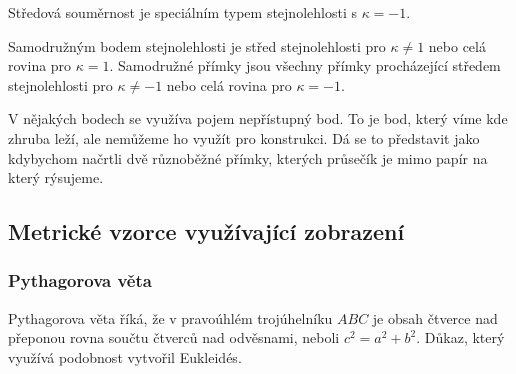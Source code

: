 \documentclass[12pt]{article}
\begin{document}
Středová souměrnost je speciálním typem stejnolehlosti s $\kappa = -1$.

Samodružným bodem stejnolehlosti je střed stejnolehlosti pro $\kappa \ne 1$ nebo celá rovina
pro $\kappa = 1$. Samodružné přímky jsou všechny přímky procházející středem stejnolehlosti pro
$\kappa \ne -1$ nebo celá rovina pro $\kappa = -1$.

V nějakých bodech se využíva pojem nepřístupný bod. To je bod, který víme kde zhruba leží, ale
nemůžeme ho využít pro konstrukci. Dá se to představit jako kdybychom načrtli dvě různoběžné přímky,
kterých průsečík je mimo papír na který rýsujeme.

\subsection*{Metrické vzorce využívající zobrazení}
\subsubsection*{Pythagorova věta}
Pythagorova věta říká, že v pravoúhlém trojúhelníku $ABC$ je obsah čtverce nad přeponou rovna součtu
čtverců nad odvěsnami, neboli $c^2 = a^2 + b^2$. Důkaz, který využívá podobnost vytvořil Eukleidés.
\end{document}
